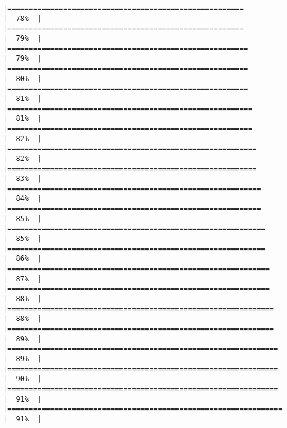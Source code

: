 \documentclass[
]{article}
\begin{document}
\begin{verbatim}
|=======================================================               |  78%  |                                                                              |=======================================================               |  79%  |                                                                              |========================================================              |  79%  |                                                                              |========================================================              |  80%  |                                                                              |========================================================              |  81%  |                                                                              |=========================================================             |  81%  |                                                                              |=========================================================             |  82%  |                                                                              |==========================================================            |  82%  |                                                                              |==========================================================            |  83%  |                                                                              |===========================================================           |  84%  |                                                                              |===========================================================           |  85%  |                                                                              |============================================================          |  85%  |                                                                              |============================================================          |  86%  |                                                                              |=============================================================         |  87%  |                                                                              |=============================================================         |  88%  |                                                                              |==============================================================        |  88%  |                                                                              |==============================================================        |  89%  |                                                                              |===============================================================       |  89%  |                                                                              |===============================================================       |  90%  |                                                                              |===============================================================       |  91%  |                                                                              |================================================================      |  91%  |                                                                              
\end{verbatim}
\end{document}

